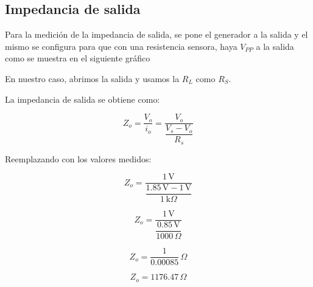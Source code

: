     \subsection{Impedancia de salida}
    Para la medición de la impedancia de salida, se pone el generador a la salida y el mismo se configura para que con
    una resistencia sensora, haya $V_{PP}$ a la salida como se muestra en el siguiente gráfico
    \begin{figure}[H]
      \centering
    \end{figure}

    \vspace{0.5cm}

    En nuestro caso, abrimos la salida y usamos la $R_L$ como $R_S$.

    La impedancia de salida se obtiene como:

    \[
    Z_o = \frac{V_o}{i_o} 
         = \frac{V_o}{\dfrac{V_s - V_o}{R_s}}
    \]
    
    Reemplazando con los valores medidos:
    
    \[
    Z_o = \frac{1\,\text{V}}{\dfrac{1.85\,\text{V} - 1\,\text{V}}{1\,\text{k}\Omega}}
    \]
    
    \[
    Z_o = \frac{1\,\text{V}}{\dfrac{0.85\,\text{V}}{1000\,\Omega}}
    \]
    
    \[
    Z_o = \frac{1}{0.00085}\,\Omega
    \]
    
    \[
    Z_o = \boxed{1176.47\,\Omega}
    \]

   

    

